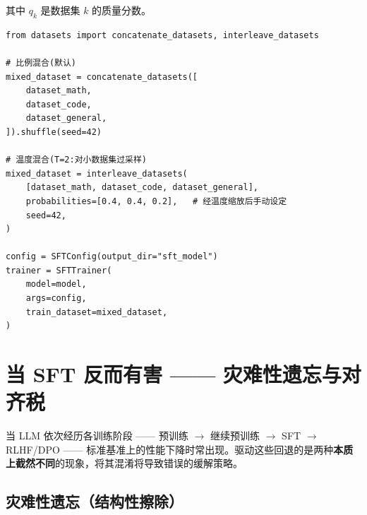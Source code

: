其中 $q_k$ 是数据集 $k$ 的质量分数。

\begin{examplebox}
\begin{lstlisting}[style=pythonstyle]
from datasets import concatenate_datasets, interleave_datasets

# 比例混合(默认)
mixed_dataset = concatenate_datasets([
    dataset_math,
    dataset_code,
    dataset_general,
]).shuffle(seed=42)

# 温度混合(T=2:对小数据集过采样)
mixed_dataset = interleave_datasets(
    [dataset_math, dataset_code, dataset_general],
    probabilities=[0.4, 0.4, 0.2],   # 经温度缩放后手动设定
    seed=42,
)

config = SFTConfig(output_dir="sft_model")
trainer = SFTTrainer(
    model=model,
    args=config,
    train_dataset=mixed_dataset,
)
\end{lstlisting}
\end{examplebox}

\section{当 SFT 反而有害 —— 灾难性遗忘与对齐税}
\label{sec:sft-pitfalls}

当 LLM 依次经历各训练阶段 —— 预训练 $\rightarrow$ 继续预训练 $\rightarrow$ SFT $\rightarrow$ RLHF/DPO —— 标准基准上的性能下降时常出现。驱动这些回退的是两种\textbf{本质上截然不同}的现象，将其混淆将导致错误的缓解策略。

\subsection{灾难性遗忘（结构性擦除）}
\label{catastrophic-forgetting-structural-erasure}

